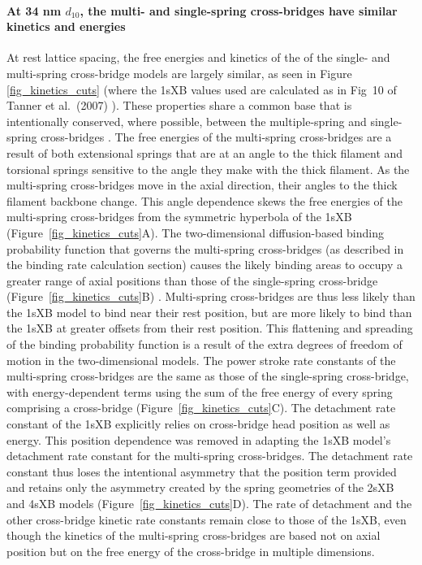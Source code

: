 \documentclass[10pt]{article}
\newcommand{\citep}[1]{\cite{#1}} %
\begin{document}
\paragraph{At 34 nm $d_{10}$, the multi- and single-spring cross-bridges have similar kinetics and energies} %
At rest lattice spacing, the free energies and kinetics of the of the single- and multi-spring cross-bridge models are largely similar, as seen in Figure \ref{fig_kinetics_cuts} (where the 1sXB values used are calculated as in Fig~10 of Tanner et al.~(2007) \citep{Tanner2007}).  
These properties share a common base that is intentionally conserved, where possible, between the multiple-spring and single-spring cross-bridges \citep{Pate1989}.
The free energies of the multi-spring cross-bridges are a result of both extensional springs that are at an angle to the thick filament and torsional springs sensitive to the angle they make with the thick filament. 
As the multi-spring cross-bridges move in the axial direction, their angles to the thick filament backbone change. 
This angle dependence skews the free energies of the multi-spring cross-bridges from the symmetric hyperbola of the 1sXB (Figure~\ref{fig_kinetics_cuts}A).
The two-dimensional diffusion-based binding probability function that governs the multi-spring cross-bridges (as described in the binding rate calculation section) causes the likely binding areas to occupy a greater range of axial positions than those of the single-spring cross-bridge (Figure~\ref{fig_kinetics_cuts}B) \citep{BergBook, DillBook}.
Multi-spring cross-bridges are thus less likely than the 1sXB model to bind near their rest position, but are more likely to bind than the 1sXB at greater offsets from their rest position. 
This flattening and spreading of the binding probability function is a result of the extra degrees of freedom of motion in the two-dimensional models. 
The power stroke rate constants of the multi-spring cross-bridges are the same as those of the single-spring cross-bridge, with energy-dependent terms using the sum of the free energy of every spring comprising a cross-bridge (Figure~\ref{fig_kinetics_cuts}C). 
The detachment rate constant of the 1sXB explicitly relies on cross-bridge head position as well as energy.
This position dependence was removed in adapting the 1sXB model's detachment rate constant for the multi-spring cross-bridges. 
The detachment rate constant thus loses the intentional asymmetry that the position term provided and retains only the asymmetry created by the spring geometries of the 2sXB and 4sXB models (Figure~\ref{fig_kinetics_cuts}D). 
The rate of detachment and the other cross-bridge kinetic rate constants remain close to those of the 1sXB, even though the kinetics of the multi-spring cross-bridges are based not on axial position but on the free energy of the cross-bridge in multiple dimensions. 
\end{document}
